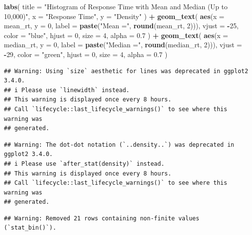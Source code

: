 \documentclass[
]{article}
\newenvironment{Shaded}{\begin{snugshade}}{\end{snugshade}}
\newcommand{\AttributeTok}[1]{\textcolor[rgb]{0.13,0.29,0.53}{#1}}
\newcommand{\DecValTok}[1]{\textcolor[rgb]{0.00,0.00,0.81}{#1}}
\newcommand{\FloatTok}[1]{\textcolor[rgb]{0.00,0.00,0.81}{#1}}
\newcommand{\FunctionTok}[1]{\textcolor[rgb]{0.13,0.29,0.53}{\textbf{#1}}}
\newcommand{\NormalTok}[1]{#1}
\newcommand{\SpecialCharTok}[1]{\textcolor[rgb]{0.81,0.36,0.00}{\textbf{#1}}}
\newcommand{\StringTok}[1]{\textcolor[rgb]{0.31,0.60,0.02}{#1}}
\begin{document}
\begin{Shaded}
\begin{Highlighting}[]
  \FunctionTok{labs}\NormalTok{(}
    \AttributeTok{title =} \StringTok{"Histogram of Response Time with Mean and Median (Up to 10,000)"}\NormalTok{,}
    \AttributeTok{x =} \StringTok{"Response Time"}\NormalTok{,}
    \AttributeTok{y =} \StringTok{"Density"}
\NormalTok{  ) }\SpecialCharTok{+}
  \FunctionTok{geom\_text}\NormalTok{(}
    \FunctionTok{aes}\NormalTok{(}\AttributeTok{x =}\NormalTok{ mean\_rt, }\AttributeTok{y =} \DecValTok{0}\NormalTok{, }\AttributeTok{label =} \FunctionTok{paste}\NormalTok{(}\StringTok{"Mean ="}\NormalTok{, }\FunctionTok{round}\NormalTok{(mean\_rt, }\DecValTok{2}\NormalTok{))), }
    \AttributeTok{vjust =} \SpecialCharTok{{-}}\DecValTok{25}\NormalTok{, }
    \AttributeTok{color =} \StringTok{"blue"}\NormalTok{, }
    \AttributeTok{hjust =} \DecValTok{0}\NormalTok{, }
    \AttributeTok{size =} \DecValTok{4}\NormalTok{, }
    \AttributeTok{alpha =} \FloatTok{0.7}
\NormalTok{  ) }\SpecialCharTok{+}
  \FunctionTok{geom\_text}\NormalTok{(}
    \FunctionTok{aes}\NormalTok{(}\AttributeTok{x =}\NormalTok{ median\_rt, }\AttributeTok{y =} \DecValTok{0}\NormalTok{, }\AttributeTok{label =} \FunctionTok{paste}\NormalTok{(}\StringTok{"Median ="}\NormalTok{, }\FunctionTok{round}\NormalTok{(median\_rt, }\DecValTok{2}\NormalTok{))), }
    \AttributeTok{vjust =} \SpecialCharTok{{-}}\DecValTok{29}\NormalTok{, }
    \AttributeTok{color =} \StringTok{"green"}\NormalTok{, }
    \AttributeTok{hjust =} \DecValTok{0}\NormalTok{, }
    \AttributeTok{size =} \DecValTok{4}\NormalTok{, }
    \AttributeTok{alpha =} \FloatTok{0.7}
\NormalTok{  )}
\end{Highlighting}
\end{Shaded}

\begin{verbatim}
## Warning: Using `size` aesthetic for lines was deprecated in ggplot2 3.4.0.
## i Please use `linewidth` instead.
## This warning is displayed once every 8 hours.
## Call `lifecycle::last_lifecycle_warnings()` to see where this warning was
## generated.
\end{verbatim}

\begin{verbatim}
## Warning: The dot-dot notation (`..density..`) was deprecated in ggplot2 3.4.0.
## i Please use `after_stat(density)` instead.
## This warning is displayed once every 8 hours.
## Call `lifecycle::last_lifecycle_warnings()` to see where this warning was
## generated.
\end{verbatim}

\begin{verbatim}
## Warning: Removed 21 rows containing non-finite values (`stat_bin()`).
\end{verbatim}
\end{document}
